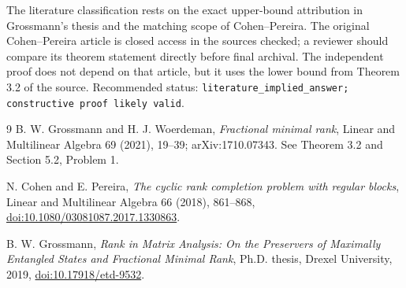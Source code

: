 \documentclass[11pt]{article}
\begin{document}
The literature classification rests on the exact upper-bound attribution in
Grossmann's thesis and the matching scope of Cohen--Pereira.  The original
Cohen--Pereira article is closed access in the sources checked; a reviewer
should compare its theorem statement directly before final archival.  The
independent proof does not depend on that article, but it uses the lower bound
from Theorem 3.2 of the source.  Recommended status:
\texttt{literature\_implied\_answer; constructive proof likely valid}.

\begin{thebibliography}{9}
B. W. Grossmann and H. J. Woerdeman,
\emph{Fractional minimal rank},
Linear and Multilinear Algebra 69 (2021), 19--39;
arXiv:1710.07343.  See Theorem 3.2 and Section 5.2, Problem 1.

N. Cohen and E. Pereira,
\emph{The cyclic rank completion problem with regular blocks},
Linear and Multilinear Algebra 66 (2018), 861--868,
\href{https://doi.org/10.1080/03081087.2017.1330863}{doi:10.1080/03081087.2017.1330863}.

B. W. Grossmann,
\emph{Rank in Matrix Analysis: On the Preservers of Maximally Entangled
States and Fractional Minimal Rank}, Ph.D. thesis, Drexel University, 2019,
\href{https://doi.org/10.17918/etd-9532}{doi:10.17918/etd-9532}.
\end{thebibliography}
\end{document}
